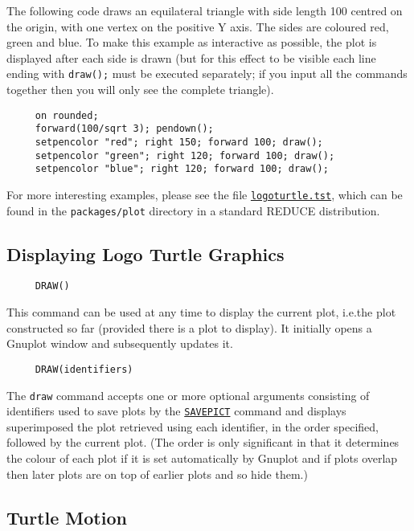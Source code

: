 The following code draws an equilateral triangle with side length 100
centred on the origin, with one vertex on the positive Y axis.  The
sides are coloured red, green and blue.  To make this example as
interactive as possible, the plot is displayed after each side is
drawn (but for this effect to be visible each line ending with
\texttt{draw();} must be executed separately; if you input all the
commands together then you will only see the complete triangle).
\begin{verbatim}
     on rounded;
     forward(100/sqrt 3); pendown();
     setpencolor "red"; right 150; forward 100; draw();
     setpencolor "green"; right 120; forward 100; draw();
     setpencolor "blue"; right 120; forward 100; draw();
\end{verbatim}

For more interesting examples, please see the file
\href{https://sourceforge.net/p/reduce-algebra/code/HEAD/tree/trunk/packages/plot/logoturtle.tst}{\texttt{logoturtle.tst}},
which can be found in the \texttt{packages/plot} directory in a
standard REDUCE distribution.


\subsection{Displaying Logo Turtle Graphics}

\begin{verbatim}
     DRAW()
\end{verbatim}
\label{logoturtle:draw}
This command can be used at any time to display the current plot,
i.e.\@ the plot constructed so far (provided there is a plot to
display).  It initially opens a Gnuplot window and subsequently
updates it.

\begin{verbatim}
     DRAW(identifiers)
\end{verbatim}
The \texttt{draw} command accepts one or more optional arguments
consisting of identifiers used to save plots by the
\hyperref[logoturtle:savepict]{\texttt{SAVEPICT}} command and displays
superimposed the plot retrieved using each identifier, in the order
specified, followed by the current plot.  (The order is only
significant in that it determines the colour of each plot if it is set
automatically by Gnuplot and if plots overlap then later plots are on
top of earlier plots and so hide them.)


\subsection{Turtle Motion}

